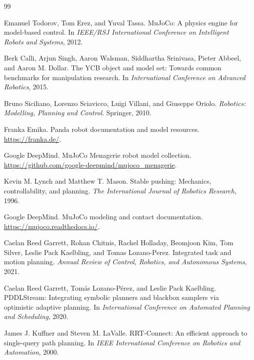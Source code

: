 \documentclass{article}
\begin{document}
\begin{thebibliography}{99}

Emanuel Todorov, Tom Erez, and Yuval Tassa.
\newblock MuJoCo: A physics engine for model-based control.
\newblock In \emph{IEEE/RSJ International Conference on Intelligent Robots and Systems}, 2012.

Berk Calli, Arjun Singh, Aaron Walsman, Siddhartha Srinivasa, Pieter Abbeel, and Aaron M. Dollar.
\newblock The YCB object and model set: Towards common benchmarks for manipulation research.
\newblock In \emph{International Conference on Advanced Robotics}, 2015.

Bruno Siciliano, Lorenzo Sciavicco, Luigi Villani, and Giuseppe Oriolo.
\newblock \emph{Robotics: Modelling, Planning and Control}.
\newblock Springer, 2010.

Franka Emika.
\newblock Panda robot documentation and model resources.
\newblock \url{https://franka.de/}.

Google DeepMind.
\newblock MuJoCo Menagerie robot model collection.
\newblock \url{https://github.com/google-deepmind/mujoco_menagerie}.

Kevin M. Lynch and Matthew T. Mason.
\newblock Stable pushing: Mechanics, controllability, and planning.
\newblock \emph{The International Journal of Robotics Research}, 1996.

Google DeepMind.
\newblock MuJoCo modeling and contact documentation.
\newblock \url{https://mujoco.readthedocs.io/}.

Caelan Reed Garrett, Rohan Chitnis, Rachel Holladay, Beomjoon Kim, Tom Silver, Leslie Pack Kaelbling, and Tomas Lozano-Perez.
\newblock Integrated task and motion planning.
\newblock \emph{Annual Review of Control, Robotics, and Autonomous Systems}, 2021.

Caelan Reed Garrett, Tomás Lozano-Pérez, and Leslie Pack Kaelbling.
\newblock PDDLStream: Integrating symbolic planners and blackbox samplers via optimistic adaptive planning.
\newblock In \emph{International Conference on Automated Planning and Scheduling}, 2020.

James J. Kuffner and Steven M. LaValle.
\newblock RRT-Connect: An efficient approach to single-query path planning.
\newblock In \emph{IEEE International Conference on Robotics and Automation}, 2000.


\end{thebibliography}
\end{document}
